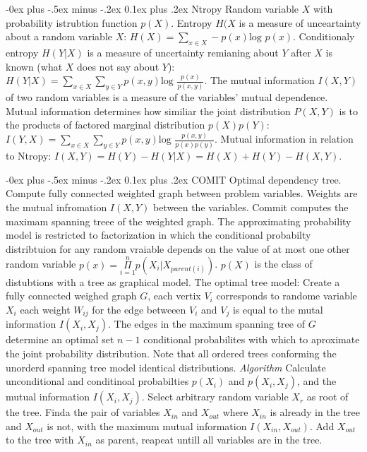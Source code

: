\documentclass[8pt,landscape]{extarticle}
\makeatletter
\renewcommand{\subsubsection}{\@startsection{subsubsection}{3}{0mm}%
                                {-0ex plus -.5ex minus -.2ex}%
                                {0.1ex plus .2ex}%
                                {\normalfont\small\bfseries}}
\makeatother
\begin{document}
\begin{multicols}{4}
\subsubsection{Ntropy}
Random variable $X$ with probability istrubtion function $p(X)$. Entropy
$H(X$ is a measure of unceartainty about a random variable $X$:
$H(X) =\sum_{x\in X}-p(x)\mbox{log }p(x)$. Conditionaly entropy $H(Y|X)$ is
a measure of uncertainty remianing about $Y$ after $X$ is known (what $X$
does not say about $Y$):
$H(Y|X) =\sum\limits_{x\in X}\sum\limits_{y\in Y}p(x,y)\mbox{log }
\frac{p(x)}{p(x,y)}$. The mutual information $I(X,Y)$ of two random variables
is a measure of the variables' mutual dependence. Mutual information determines
how similiar the joint distribution $P(X,Y)$ is to the products of factored
marginal distribution $p(X)p(Y)$:
$I(Y,X) =\sum\limits_{x\in X}\sum\limits_{y\in Y}p(x,y)\mbox{log }
\frac{p(x,y)}{p(x)p(y)}$. Mutual information in relation to Ntropy:
$I(X,Y) = H(Y)-H(Y|X)=H(X)+H(Y)-H(X,Y)$.

\subsubsection{COMIT}
Optimal dependency tree. Compute fully connected weighted graph between problem
variables. Weights are the mutual infromation $I(X,Y)$ between the variables.
Commit computes the maximam spanning treee of the weighted graph. The approximating
probability model is restricted to factorization in which the conditional
probabilty distribtuion for any random vraiable depends on the value of at
most one other random variable
$p(x)=\overset{n}{\underset{i=1}{\Pi}}p(X_i|X_{parent(i)})$.
$p(X)$ is the class of distubtions with a tree as graphical model.
The optimal tree model: Create a fully connected weighed graph $G$,
each vertix $V_i$ corresponds to randome variable $X_i$ each weight $W_{ij}$
for the edge betweeen $V_i$ and $V_j$ is equal to the mutal information
$I(X_i, X_j)$. The edges in the maximum spanning tree of $G$ determine an
optimal set $n-1$ conditional probabilites with which to aproximate the joint
probability distribution. Note that all ordered trees conforming the unorderd
spanning tree model identical distributions.
\emph{Algorithm} Calculate unconditional and conditinoal probabilties
$p(X_i)$ and $p(X_i,X_j)$, and the mutual information $I(X_i,X_j)$.
Select arbitrary random variable $X_r$ as root of the tree. Finda the
pair of variables $X_{in}$ and $X_{out}$ where $X_{in}$ is already in the
tree and $X_{out}$ is not, with the maximum mutual information
$I(X_{in}, X_{out})$. Add $X_{out}$ to the tree with $X_{in}$ as parent,
reapeat untill all variables are in the tree.


\end{multicols}
\end{document}
